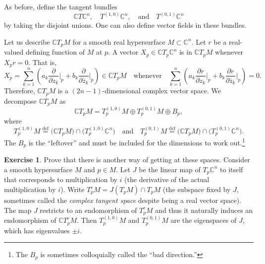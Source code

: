 \documentclass[12pt,openany]{book}
\newcommand{\C}{{\mathbb{C}}}
\newcommand{\myindex}[1]{#1\index{#1}}
\theoremstyle{plain}
\theoremstyle{remark}
\theoremstyle{definition}
\newenvironment{exbox}{%
    \def\FrameCommand{\vrule width 1pt \relax\hspace{10pt}}%
    \MakeFramed{\advance\hsize-\width\FrameRestore}%
}{%
    \endMakeFramed
}
\theoremstyle{exercise}
\newtheorem{exercise}{Exercise}[section]
\theoremstyle{example}
\begin{document}
As before, define the tangent bundles
\begin{equation*}
\C T\C^n,
\quad
T^{(1,0)} \C^n ,
\quad \text{and} \quad
T^{(0,1)} \C^n
\end{equation*}
by taking the disjoint unions.
One can also define vector fields in these bundles.

Let us describe $\C T_pM$
for a smooth real hypersurface $M \subset \C^n$.
Let $r$ be a real-valued defining function of
$M$ at $p$.  A vector
$X_p \in \C T_p\C^n$ is in
$\C T_pM$ whenever $X_p r = 0$.  That is,
\begin{equation*}
X_p = \sum_{k=1}^n
\left(
a_k
\frac{\partial}{\partial z_k} \Big|_p
+
b_k
\frac{\partial}{\partial \bar{z}_k} \Big|_p
\right) \in \C T_p M
\quad
\text{whenever}
\quad
 \sum_{k=1}^n
\left(
a_k
\frac{\partial r}{\partial z_k} \Big|_p
+
b_k
\frac{\partial r}{\partial \bar{z}_k} \Big|_p
\right)
= 0 .
\end{equation*}
Therefore, $\C T_p M$ is a $(2n-1)$-dimensional complex vector space.
We decompose $\C T_p M$ as
\begin{equation*}
\C T_pM =
T_p^{(1,0)} M \oplus T_p^{(0,1)} M \oplus B_p ,
\end{equation*}
where
\begin{equation*}
T_p^{(1,0)} M \overset{\text{def}}{=} \bigl( \C T_pM \bigr) \cap
\bigl( T_p^{(1,0)} \C^n \bigr)
\quad \text{and} \quad
T_p^{(0,1)} M \overset{\text{def}}{=} \bigl( \C T_pM \bigr) \cap
\bigl( T_p^{(0,1)} \C^n \bigr) .
\end{equation*}
The $B_p$ is the ``leftover'' and must
be included for the dimensions to work out.\footnote{%
The $B_p$ is sometimes colloquially called the ``bad direction.''}

\begin{exbox}
\begin{exercise}
Prove that there is another way of getting at these spaces.  Consider a smooth
hypersurface $M$ and $p \in M$.  Let $J$ be the linear map of $T_p \C^n$ to
itself that corresponds to multiplication by $i$
(the derivative of the actual multiplication by $i$).
Write $T^c_p M = J(T_p M) \cap T_pM$ (the subspace fixed by $J$, sometimes
called the \emph{\myindex{complex tangent space}} despite being a real
vector space).
The map $J$ restricts to an endomorphism of $T^c_pM$ and thus it naturally induces
an endomorphism of $\C T^c_pM$.
Then $T^{(1,0)}_pM$ and
$T^{(0,1)}_pM$ are the eigenspaces of $J$, which has eigenvalues $\pm i$.
\end{exercise}
\end{exbox}
\end{document}
